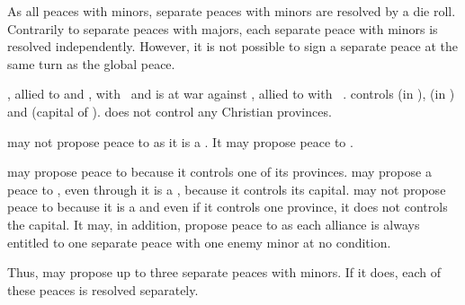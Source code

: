 \bparag As all peaces with minors, separate peaces with minors are resolved by
a die roll.
\bparag Contrarily to separate peaces with majors, each separate peace with
minors is resolved independently.
\bparag However, it is not possible to sign a separate peace at the same turn
as the global peace.

\begin{exemple}
  \TUR, allied to \paysMaroc and \paysTripoli, with \VASSAL\ \paysAlgerie and
  \paysTunisie is at war against \HIS, allied to \paysVenise with \VASSAL\
  \paysChevaliers. \HIS controls \provinceJebelTubqal (in \paysMaroc),
  \provinceOran (in \paysAlgerie) and \provinceIfriqiya (capital of
  \paysTunisie). \TUR does not control any Christian provinces.

  \TUR may not propose peace to \paysChevaliers as it is a \VASSAL. It may
  propose peace to \paysVenise.

  \HIS may propose peace to \paysMaroc because it controls one of its
  provinces. \HIS may propose a peace to \paysTunisie, even through it is a
  \VASSAL, because it controls its capital. \HIS may not propose peace to
  \paysAlgerie because it is a \VASSAL and even if it controls one province,
  it does not controls the capital. It may, in addition, propose peace to
  \paysTripoli as each alliance is always entitled to one separate peace with
  one enemy minor at no condition. 

  Thus, \HIS may propose up to three separate peaces with minors. If it does,
  each of these peaces is resolved separately.
\end{exemple}

